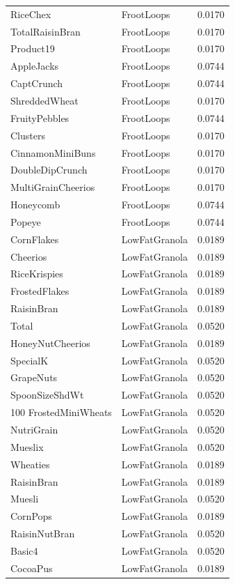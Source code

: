 \begin{longtable}{llr}
RiceChex & FrootLoops & 0.0170 \\
TotalRaisinBran & FrootLoops & 0.0170 \\
Product19 & FrootLoops & 0.0170 \\
AppleJacks & FrootLoops & 0.0744 \\
CaptCrunch & FrootLoops & 0.0744 \\
ShreddedWheat & FrootLoops & 0.0170 \\
FruityPebbles & FrootLoops & 0.0744 \\
Clusters & FrootLoops & 0.0170 \\
CinnamonMiniBuns & FrootLoops & 0.0170 \\
DoubleDipCrunch & FrootLoops & 0.0170 \\
MultiGrainCheerios & FrootLoops & 0.0170 \\
Honeycomb & FrootLoops & 0.0744 \\
Popeye & FrootLoops & 0.0744 \\
CornFlakes & LowFatGranola & 0.0189 \\
Cheerios & LowFatGranola & 0.0189 \\
RiceKrispies & LowFatGranola & 0.0189 \\
FrostedFlakes & LowFatGranola & 0.0189 \\
RaisinBran & LowFatGranola & 0.0189 \\
Total & LowFatGranola & 0.0520 \\
HoneyNutCheerios & LowFatGranola & 0.0189 \\
SpecialK & LowFatGranola & 0.0520 \\
GrapeNuts & LowFatGranola & 0.0520 \\
SpoonSizeShdWt & LowFatGranola & 0.0520 \\
100%
FrostedMiniWheats & LowFatGranola & 0.0520 \\
NutriGrain & LowFatGranola & 0.0520 \\
Mueslix & LowFatGranola & 0.0520 \\
Wheaties & LowFatGranola & 0.0189 \\
RaisinBran & LowFatGranola & 0.0189 \\
Muesli & LowFatGranola & 0.0520 \\
CornPops & LowFatGranola & 0.0189 \\
RaisinNutBran & LowFatGranola & 0.0520 \\
Basic4 & LowFatGranola & 0.0520 \\
CocoaPus & LowFatGranola & 0.0189 \\

\end{longtable}
